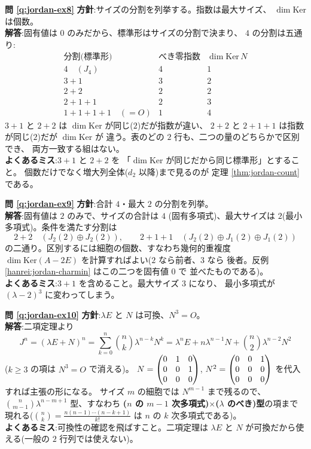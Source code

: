 \bigskip
\noindent\textbf{問 \ref{q:jordan-ex8}}\quad
\textbf{方針}:サイズの分割を列挙する。指数は最大サイズ、
$\dim \mathrm{Ker}$ は個数。\\
\textbf{解答}:固有値は $0$ のみだから、標準形はサイズの分割で決まり、
$4$ の分割は五通り:
\[
\begin{array}{lcc}
\text{分割(標準形)} & \text{べき零指数} & \dim \mathrm{Ker}\,N \\
\hline
4 \quad (J_4) & 4 & 1 \\
3 + 1 & 3 & 2 \\
2 + 2 & 2 & 2 \\
2 + 1 + 1 & 2 & 3 \\
1 + 1 + 1 + 1 \quad (= O) & 1 & 4
\end{array}
\]
$3{+}1$ と $2{+}2$ は $\dim \mathrm{Ker}$ が同じ($2$)だが指数が違い、
$2{+}2$ と $2{+}1{+}1$ は指数が同じ($2$)だが $\dim \mathrm{Ker}$ が
違う。表のどの $2$ 行も、二つの量のどちらかで区別でき、
両方一致する組はない。\\
\textbf{よくあるミス}:$3{+}1$ と $2{+}2$ を
「$\dim \mathrm{Ker}$ が同じだから同じ標準形」とすること。
個数だけでなく増大列全体($d_2$ 以降)まで見るのが
定理 \ref{thm:jordan-count} である。

\bigskip
\noindent\textbf{問 \ref{q:jordan-ex9}}\quad
\textbf{方針}:合計 $4$・最大 $2$ の分割を列挙。\\
\textbf{解答}:固有値は $2$ のみで、サイズの合計は $4$
(固有多項式)、最大サイズは $2$(最小多項式)。条件を満たす分割は
\[
2 + 2 \quad (J_2(2) \oplus J_2(2)), \qquad
2 + 1 + 1 \quad (J_2(2) \oplus J_1(2) \oplus J_1(2))
\]
の二通り。区別するには細胞の個数、すなわち幾何的重複度
$\dim \mathrm{Ker}(A - 2E)$ を計算すればよい($2$ なら前者、$3$ なら
後者。反例 \ref{hanrei:jordan-charmin} はこの二つを固有値 $0$ で
並べたものである)。\\
\textbf{よくあるミス}:$3 + 1$ を含めること。最大サイズ $3$ になり、
最小多項式が $(\lambda - 2)^3$ に変わってしまう。

\bigskip
\noindent\textbf{問 \ref{q:jordan-ex10}}\quad
\textbf{方針}:$\lambda E$ と $N$ は可換、$N^3 = O$。\\
\textbf{解答}:二項定理より
\[
J^n = (\lambda E + N)^n
= \sum_{k=0}^{n} \binom{n}{k} \lambda^{n-k} N^k
= \lambda^n E + n\lambda^{n-1} N + \binom{n}{2}\lambda^{n-2} N^2
\]
($k \ge 3$ の項は $N^3 = O$ で消える)。
$N = \begin{pmatrix}0 & 1 & 0 \\ 0 & 0 & 1 \\ 0 & 0 & 0\end{pmatrix}$,
$N^2 = \begin{pmatrix}0 & 0 & 1 \\ 0 & 0 & 0 \\ 0 & 0 & 0\end{pmatrix}$ を代入すれば主張の形になる。
サイズ $m$ の細胞では $N^{m-1}$ まで残るので、
$\binom{n}{m-1}\lambda^{n-m+1}$ 型、すなわち
\textbf{($n$ の $m-1$ 次多項式)$\times$($\lambda$ のべき)型}の項まで
現れる($\binom{n}{k} = \frac{n(n-1)\cdots(n-k+1)}{k!}$ は $n$ の
$k$ 次多項式である)。\\
\textbf{よくあるミス}:可換性の確認を飛ばすこと。二項定理は
$\lambda E$ と $N$ が可換だから使える(一般の $2$ 行列では使えない)。

